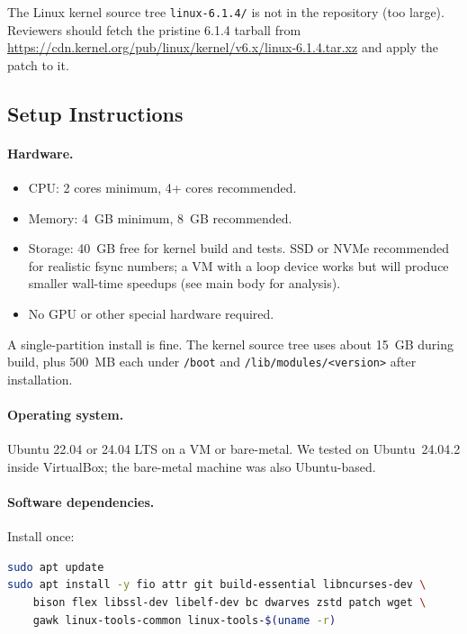 \documentclass[11pt,a4paper]{article}
\begin{document}
The Linux kernel source tree \texttt{linux-6.1.4/} is not in the
repository (too large). Reviewers should fetch the pristine 6.1.4
tarball from \url{https://cdn.kernel.org/pub/linux/kernel/v6.x/linux-6.1.4.tar.xz}
and apply the patch to it.

\subsection{Setup Instructions}

\paragraph{Hardware.}
\begin{itemize}[leftmargin=*]
  \item CPU: 2 cores minimum, 4+ cores recommended.
  \item Memory: 4~GB minimum, 8~GB recommended.
  \item Storage: 40~GB free for kernel build and tests. SSD or NVMe
        recommended for realistic fsync numbers; a VM with a loop
        device works but will produce smaller wall-time speedups
        (see main body for analysis).
  \item No GPU or other special hardware required.
\end{itemize}

A single-partition install is fine. The kernel source tree uses
about 15~GB during build, plus 500~MB each under \texttt{/boot} and
\texttt{/lib/modules/<version>} after installation.

\paragraph{Operating system.} Ubuntu 22.04 or 24.04 LTS on a VM or
bare-metal. We tested on Ubuntu~24.04.2 inside VirtualBox; the
bare-metal machine was also Ubuntu-based.

\paragraph{Software dependencies.} Install once:

\begin{lstlisting}[language=bash]
sudo apt update
sudo apt install -y fio attr git build-essential libncurses-dev \
    bison flex libssl-dev libelf-dev bc dwarves zstd patch wget \
    gawk linux-tools-common linux-tools-$(uname -r)
\end{lstlisting}
\end{document}
